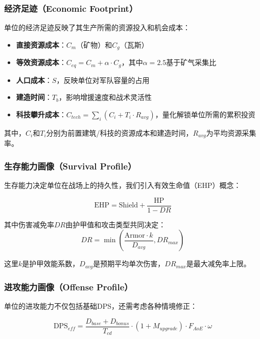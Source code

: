 \documentclass[a4paper,12pt]{article}
\begin{document}
\subsubsection{经济足迹（Economic Footprint）}
单位的经济足迹反映了其生产所需的资源投入和机会成本：

\begin{itemize}
\item \textbf{直接资源成本}：$C_m$（矿物）和$C_g$（瓦斯）
\item \textbf{等效资源成本}：$C_{eq} = C_m + \alpha \cdot C_g$，其中$\alpha = 2.5$基于矿气采集比
\item \textbf{人口成本}：$S$，反映单位对军队容量的占用
\item \textbf{建造时间}：$T_b$，影响增援速度和战术灵活性
\item \textbf{科技攀升成本}：$C_{tech} = \sum_{i} (C_i + T_i \cdot R_{avg})$，量化解锁单位所需的累积投资
\end{itemize}

其中，$C_i$和$T_i$分别为前置建筑/科技的资源成本和建造时间，$R_{avg}$为平均资源采集率。

\subsubsection{生存能力画像（Survival Profile）}
生存能力决定单位在战场上的持久性，我们引入有效生命值（EHP）概念：

\begin{equation}
\text{EHP} = \text{Shield} + \frac{\text{HP}}{1 - DR}
\end{equation}

其中伤害减免率$DR$由护甲值和攻击类型共同决定：
\begin{equation}
DR = \min\left(\frac{\text{Armor} \cdot k}{D_{avg}}, DR_{max}\right)
\end{equation}

这里$k$是护甲效能系数，$D_{avg}$是预期平均单次伤害，$DR_{max}$是最大减免率上限。

\subsubsection{进攻能力画像（Offense Profile）}
单位的进攻能力不仅包括基础DPS，还需考虑各种情境修正：

\begin{equation}
\text{DPS}_{eff} = \frac{D_{base} + D_{bonus}}{T_{cd}} \cdot (1 + M_{upgrade}) \cdot F_{AoE} \cdot \omega
\end{equation}
\end{document}
